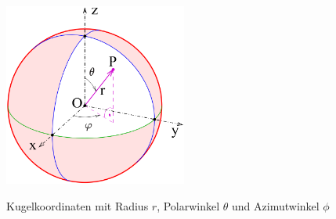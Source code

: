 \begin{figure}
	\centering
	\includegraphics[width=6cm]{papers/geodaeten/Abbildungen/Linienelemente/LinKugel1}
	\caption{Kugelkoordinaten mit Radius $r$, Polarwinkel $\theta$ und Azimutwinkel $\phi$}
	\label{geodaeten:figure:Linienelemente:Kugelkoordinaten:Kugelkoordinaten}
	\cite{geodaeten:Kugelkoordinaten}
\end{figure}
